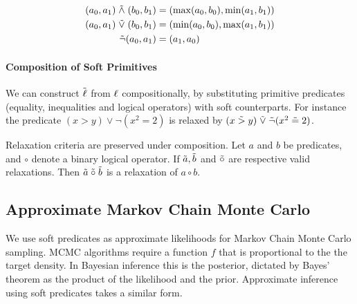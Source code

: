 {\small
\begin{equation}  
\begin{aligned}
(a_0, a_1) \mathrel{\tilde{\land}} (b_0, b_1) &= (\max(a_0, b_0), \min(a_1, b_1))\\
(a_0, a_1) \mathrel{\tilde{\lor}} (b_0, b_1) &= (\min(a_0, b_0), \max(a_1, b_1))\\ 
\tilde{\neg}(a_0, a_1) &= (a_1, a_0)
\label{softw}
\end{aligned}
\end{equation}
}


\paragraph{Composition of Soft Primitives} We can construct $\mathrel{\tilde{\operatorname{\ell}}}$ from $\operatorname{\ell}$ compositionally, by substituting primitive predicates (equality, inequalities and logical operators) with soft counterparts.
For instance the predicate $(x > y) \lor \neg(x^2 = 2)$ is relaxed by $(x \mathrel{\tilde{>}} y) \mathrel{\tilde{\lor}} \tilde{\neg}(x^2 \mathrel{\tilde{=}} 2)$.

\begin{proposition}Relaxation criteria are preserved under composition.
Let $a$ and $b$ be predicates, and $\circ$ denote a binary logical operator.  If $\tilde{a}, \tilde{b}$ and $\mathrel{\tilde{\circ}}$ are respective valid relaxations.  Then $\tilde{a} \mathrel{\tilde{\circ}} \tilde{b}$ is a relaxation of $a \circ b$.
\end{proposition}



\subsection{Approximate Markov Chain Monte Carlo}
We use soft predicates as approximate likelihoods for Markov Chain Monte Carlo sampling.
MCMC algorithms require a function $f$ that is proportional to the the target density.
In Bayesian inference this is the posterior, dictated by Bayes' theorem as the product of the likelihood and the prior.
Approximate inference using soft predicates takes a similar form.

